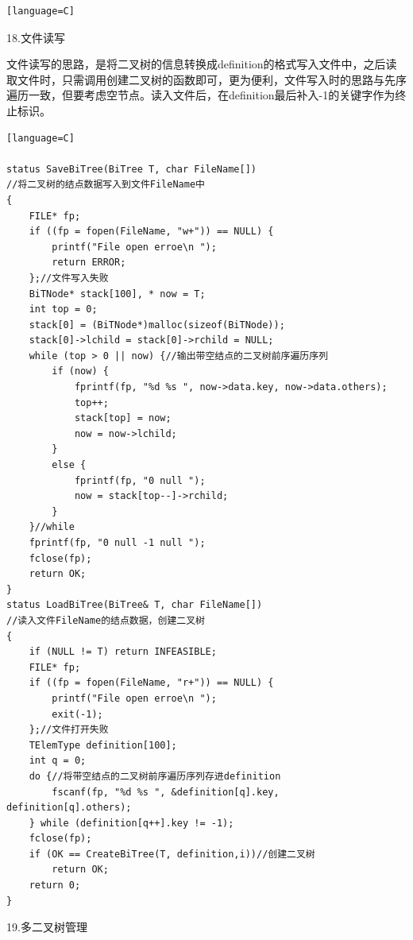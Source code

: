 \documentclass[supercite]{Experimental_Report}
\theoremstyle{definition}
\begin{document}
\begin{sloppypar}
\begin{lstlisting}[breaklines][language=C]
\end{lstlisting}

18.文件读写

文件读写的思路，是将二叉树的信息转换成definition的格式写入文件中，之后读取文件时，只需调用创建二叉树的函数即可，更为便利，文件写入时的思路与先序遍历一致，但要考虑空节点。读入文件后，在definition最后补入-1的关键字作为终止标识。
\begin{lstlisting}[breaklines][language=C]

status SaveBiTree(BiTree T, char FileName[])
//将二叉树的结点数据写入到文件FileName中
{
	FILE* fp;
	if ((fp = fopen(FileName, "w+")) == NULL) {
		printf("File open erroe\n ");
		return ERROR;
	};//文件写入失败
	BiTNode* stack[100], * now = T;
	int top = 0;
	stack[0] = (BiTNode*)malloc(sizeof(BiTNode));
	stack[0]->lchild = stack[0]->rchild = NULL;
	while (top > 0 || now) {//输出带空结点的二叉树前序遍历序列
		if (now) {
			fprintf(fp, "%d %s ", now->data.key, now->data.others);
			top++;
			stack[top] = now;
			now = now->lchild;
		}
		else {
			fprintf(fp, "0 null ");
			now = stack[top--]->rchild;
		}
	}//while
	fprintf(fp, "0 null -1 null ");
	fclose(fp);
	return OK;
}
status LoadBiTree(BiTree& T, char FileName[])
//读入文件FileName的结点数据，创建二叉树
{
	if (NULL != T) return INFEASIBLE;
	FILE* fp;
	if ((fp = fopen(FileName, "r+")) == NULL) {
		printf("File open erroe\n ");
		exit(-1);
	};//文件打开失败
	TElemType definition[100];
	int q = 0;
	do {//将带空结点的二叉树前序遍历序列存进definition
		fscanf(fp, "%d %s ", &definition[q].key, definition[q].others);
	} while (definition[q++].key != -1);
	fclose(fp);
	if (OK == CreateBiTree(T, definition,i))//创建二叉树
		return OK;
	return 0;
}

\end{lstlisting}

19.多二叉树管理


\end{sloppypar}
\end{document}
